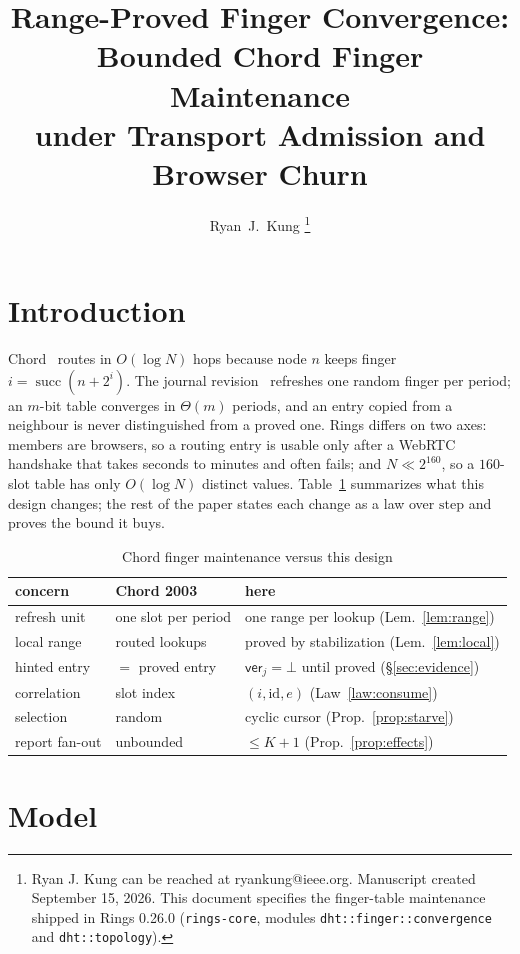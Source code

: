 \documentclass[journal]{IEEEtran}
\author{Ryan~J.~Kung%
\thanks{Ryan J. Kung can be reached at ryankung@ieee.org.
Manuscript created September 15, 2026.  This document specifies the
finger-table maintenance shipped in Rings 0.26.0 (\texttt{rings-core},
modules \texttt{dht::finger::convergence} and \texttt{dht::topology}).}}
\title{\huge Range-Proved Finger Convergence:\\
Bounded Chord Finger Maintenance\\
under Transport Admission and Browser Churn}
\date{}
\newcommand{\succf}{\operatorname{succ}}
\newcommand{\ver}{\mathsf{ver}}
\begin{document}
\maketitle

\section{Introduction}

Chord~\cite{Stoica2001} routes in $O(\log N)$ hops because node $n$ keeps
finger $i=\succf(n+2^{i})$.  The journal revision~\cite{Stoica2003}
refreshes one random finger per period; an $m$-bit table converges in
$\Theta(m)$ periods, and an entry copied from a neighbour is never
distinguished from a proved one.  Rings differs on two axes: members are
browsers, so a routing entry is usable only after a WebRTC handshake that
takes seconds to minutes and often fails; and $N\ll 2^{160}$, so a
$160$-slot table has only $O(\log N)$ distinct values.  Table~\ref{tab:delta}
summarizes what this design changes; the rest of the paper states each
change as a law over $\mathrm{step}$ and proves the bound it buys.

\begin{table}[t]
\caption{Chord finger maintenance versus this design}
\label{tab:delta}
\centering\footnotesize
\setlength{\tabcolsep}{2pt}
\begin{tabular}{@{}lll@{}}
\toprule
concern & Chord 2003~\cite{Stoica2003} & here \\
\midrule
refresh unit & one slot per period & one range per lookup (Lem.~\ref{lem:range}) \\
local range & routed lookups & proved by stabilization (Lem.~\ref{lem:local}) \\
hinted entry & $=$ proved entry & $\ver_j=\bot$ until proved (\S\ref{sec:evidence}) \\
correlation & slot index & $(i,\mathrm{id},e)$ (Law~\ref{law:consume}) \\
selection & random & cyclic cursor (Prop.~\ref{prop:starve}) \\
report fan-out & unbounded & $\le K{+}1$ (Prop.~\ref{prop:effects}) \\
\bottomrule
\end{tabular}
\end{table}

\section{Model}\label{sec:model}
\end{document}
